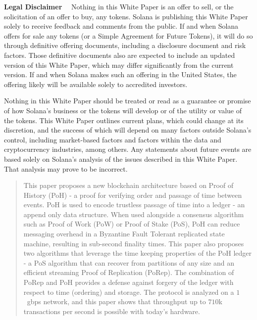 \documentclass[12pt]{article}
\begin{document}
\maketitle

\textbf{\footnotesize Legal Disclaimer}\scriptsize
~~Nothing in this White Paper is an offer to sell, or the solicitation of an offer to buy, any tokens. Solana is publishing this White Paper solely to receive feedback and comments from the public. If and when Solana offers for sale any tokens (or a Simple Agreement for Future Tokens), it will do so through definitive offering documents, including a disclosure document and risk factors. Those definitive documents also are expected to include an updated version of this White Paper, which may differ significantly from the current version. If and when Solana makes such an offering in the United States, the offering likely will be available solely to accredited investors.

Nothing in this White Paper should be treated or read as a guarantee or promise of how Solana’s business or the tokens will develop or of the utility or value of the tokens. This White Paper outlines current plans, which could change at its discretion, and the success of which will depend on many factors outside Solana’s control, including market-based factors and factors within the data and cryptocurrency industries, among others. Any statements about future events are based solely on Solana’s analysis of the issues described in this White Paper. That analysis may prove to be incorrect.

\begin{abstract}
This paper proposes a new blockchain architecture based on Proof of History (PoH) - a proof for verifying order and passage of time between events. PoH is used to encode trustless passage of time into a ledger - an append only data structure. When used alongside a consensus algorithm such as Proof of Work (PoW) or Proof of Stake (PoS), PoH can reduce messaging overhead in a Byzantine Fault Tolerant replicated state machine, resulting in sub-second finality times. This paper also proposes two algorithms that leverage the time keeping properties of the PoH ledger - a PoS algorithm that can recover from partitions of any size and an efficient streaming Proof of Replication (PoRep). The combination of PoRep and PoH provides a defense against forgery of the ledger with respect to time (ordering) and storage. The protocol is analyzed on a $1$~gbps network, and this paper shows that throughput up to $710$k transactions per second is possible with today’s hardware.
\end{abstract}
\end{document}
